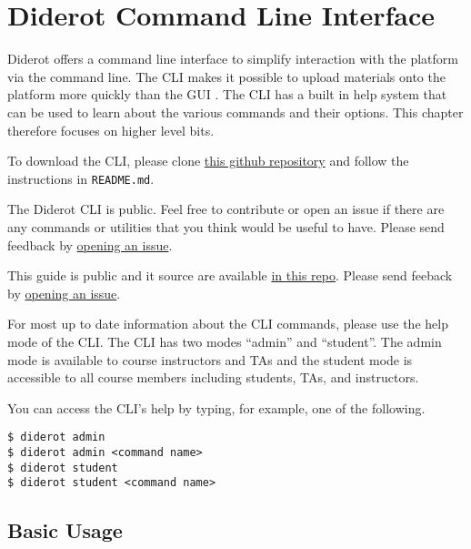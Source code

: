 \chapter{Diderot Command Line Interface}
\label{ch:cli}

Diderot offers a command line interface to simplify interaction with
the platform via the command line.
%
The CLI makes it possible to upload materials onto the platform more quickly than the GUI .
%
The CLI has a built in help system that can be used to learn about the
various commands and their options.  This chapter therefore focuses on
higher level bits.

\begin{important}


To download the CLI, please clone 
%
\href{https://github.com/diderot-edu/diderot-cli}{this github repository}
%
and follow the instructions in \lstinline`README.md`. 

The Diderot CLI is public. Feel free to contribute or open an issue if there
are any commands or utilities that you think would be useful to have.
%
Please send feedback by 
\href{https://github.com/diderot-edu/diderot-cli/issues}{opening an issue}.

This guide is public and it source are available 
\href{https://github.com/diderot-edu/diderot-guide}{in this repo}.
%
Please send feeback by \href{https://github.com/diderot-edu/diderot-guide/issues}{opening an issue}.
\end{important}

\begin{important}
For most up to date information about the CLI commands, please use the
help mode of the CLI. 
%
The CLI has two modes ``admin'' and ``student''.
%
The admin mode is available to course instructors and TAs and the
student mode is accessible to all course members including students, TAs, and instructors.


You can access the CLI's help by typing, for example, one of the following.

\begin{lstlisting}
$ diderot admin
$ diderot admin <command name>
$ diderot student
$ diderot student <command name>
\end{lstlisting}
\end{important}

\section{Basic Usage}

